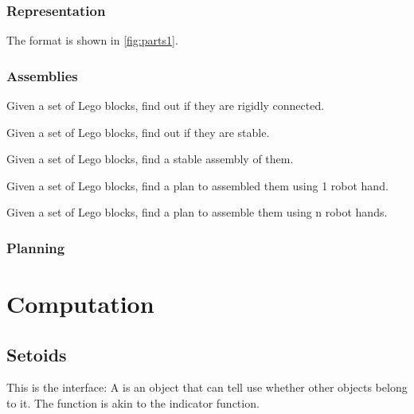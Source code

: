 \begin{exercise}
\subsection*{Representation}


The format is shown in \cref{fig:parts1}.


\subsection{Assemblies}

\begin{exercise}
Given a set of Lego blocks, find out if they are rigidly connected.
\end{exercise}

\begin{exercise}
Given a set of Lego blocks, find out if they are stable.
\end{exercise}

\begin{exercise}
Given a set of Lego blocks, find a stable assembly of them.
\end{exercise}

\begin{exercise}
Given a set of Lego blocks, find a plan to assembled them using 1 robot hand.
\end{exercise}

\begin{exercise}
Given a set of Lego blocks, find a plan to assemble them using n robot hands.
\end{exercise}

\subsection{Planning}



\chapter{Computation}


\section{Setoids}

This is the \Setoid interface:
%
%
A \Setoid is an object that can tell use whether other objects belong to it.
The  function is akin to the indicator function.



\end{exercise}
